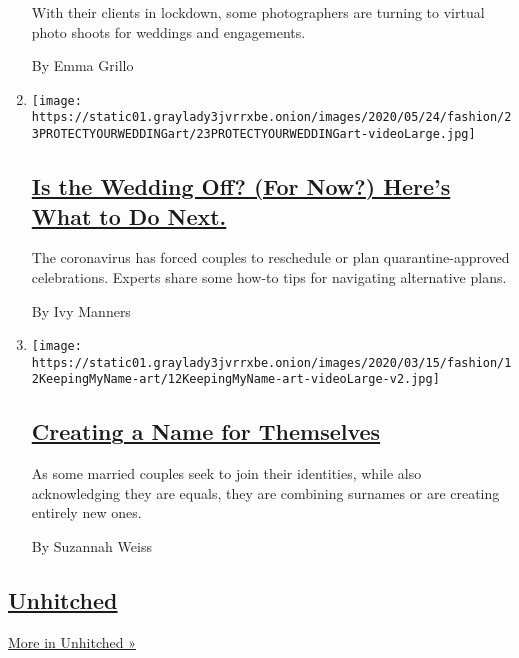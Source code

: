 \begin{enumerate}
  With their clients in lockdown, some photographers are turning to
  virtual photo shoots for weddings and engagements.

  By Emma Grillo
\item
  \texttt{[image: https://static01.graylady3jvrrxbe.onion/images/2020/05/24/fashion/23PROTECTYOURWEDDINGart/23PROTECTYOURWEDDINGart-videoLarge.jpg]}

  \hypertarget{is-the-wedding-off-for-now-heres-what-to-do-next}{%
  \subsection{\texorpdfstring{\href{/2020/05/23/fashion/weddings/is-the-wedding-off-for-now-heres-what-to-do-next.html}{Is
  the Wedding Off? (For Now?) Here's What to Do
  Next.}}{Is the Wedding Off? (For Now?) Here's What to Do Next.}}\label{is-the-wedding-off-for-now-heres-what-to-do-next}}

  The coronavirus has forced couples to reschedule or plan
  quarantine-approved celebrations. Experts share some how-to tips for
  navigating alternative plans.

  By Ivy Manners
\item
  \texttt{[image: https://static01.graylady3jvrrxbe.onion/images/2020/03/15/fashion/12KeepingMyName-art/12KeepingMyName-art-videoLarge-v2.jpg]}

  \hypertarget{creating-a-name-for-themselves}{%
  \subsection{\texorpdfstring{\href{/2020/03/11/fashion/weddings/name-change-after-marriage-not-always-easy.html}{Creating
  a Name for
  Themselves}}{Creating a Name for Themselves}}\label{creating-a-name-for-themselves}}

  As some married couples seek to join their identities, while also
  acknowledging they are equals, they are combining surnames or are
  creating entirely new ones.

  By Suzannah Weiss
\end{enumerate}

\hypertarget{unhitched}{%
\subsection{\texorpdfstring{\href{/column/unhitched}{Unhitched}}{Unhitched}}\label{unhitched}}

\href{/column/unhitched}{More in Unhitched »}

